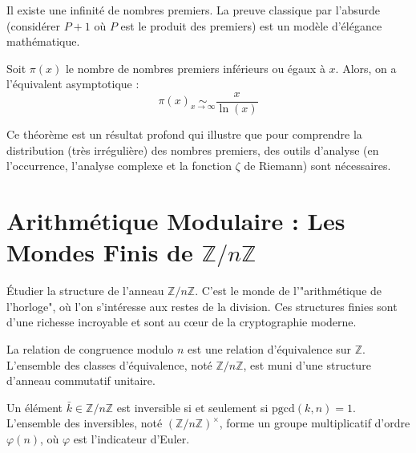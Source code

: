\begin{theorem}
    Il existe une infinité de nombres premiers. La preuve classique par l'absurde (considérer $P+1$ où $P$ est le produit des premiers) est un modèle d'élégance mathématique.
\end{theorem}

\begin{theorem}
    Soit $\pi(x)$ le nombre de nombres premiers inférieurs ou égaux à $x$. Alors, on a l'équivalent asymptotique :
    $$ \pi(x) \underset{x\to\infty}{\sim} \frac{x}{\ln(x)} $$
\end{theorem}
\begin{remark}
    Ce théorème est un résultat profond qui illustre que pour comprendre la distribution (très irrégulière) des nombres premiers, des outils d'analyse (en l'occurrence, l'analyse complexe et la fonction $\zeta$ de Riemann) sont nécessaires.
\end{remark}

\section{Arithmétique Modulaire : Les Mondes Finis de $\mathbb{Z}/n\mathbb{Z}$}

\begin{objectif}
    Étudier la structure de l'anneau $\mathbb{Z}/n\mathbb{Z}$. C'est le monde de l'"arithmétique de l'horloge", où l'on s'intéresse aux restes de la division. Ces structures finies sont d'une richesse incroyable et sont au cœur de la cryptographie moderne.
\end{objectif}

\begin{definition}
    La relation de congruence modulo $n$ est une relation d'équivalence sur $\mathbb{Z}$. L'ensemble des classes d'équivalence, noté $\mathbb{Z}/n\mathbb{Z}$, est muni d'une structure d'anneau commutatif unitaire.
\end{definition}

\begin{proposition}
    Un élément $\bar{k} \in \mathbb{Z}/n\mathbb{Z}$ est inversible si et seulement si $\mathrm{pgcd}(k,n)=1$. L'ensemble des inversibles, noté $(\mathbb{Z}/n\mathbb{Z})^\times$, forme un groupe multiplicatif d'ordre $\varphi(n)$, où $\varphi$ est l'indicateur d'Euler.
\end{proposition}

